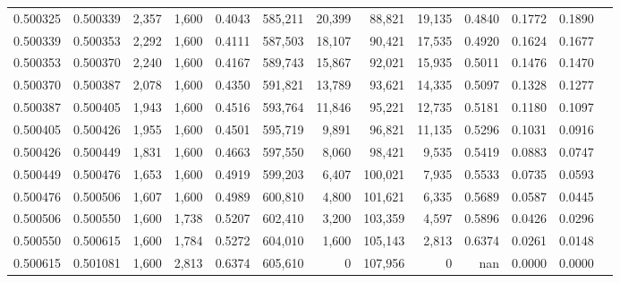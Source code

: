 \begin{tabular}{rrrrrrrrrrrrr}
0.500325 & 0.500339 &  2,357 & 1,600 &                                     0.4043 & 585,211 &  20,399 &  88,821 &  19,135 & 0.4840 & 0.1772 & 0.1890 \\
0.500339 & 0.500353 &  2,292 & 1,600 &                                     0.4111 & 587,503 &  18,107 &  90,421 &  17,535 & 0.4920 & 0.1624 & 0.1677 \\
0.500353 & 0.500370 &  2,240 & 1,600 &                                     0.4167 & 589,743 &  15,867 &  92,021 &  15,935 & 0.5011 & 0.1476 & 0.1470 \\
0.500370 & 0.500387 &  2,078 & 1,600 &                                     0.4350 & 591,821 &  13,789 &  93,621 &  14,335 & 0.5097 & 0.1328 & 0.1277 \\
0.500387 & 0.500405 &  1,943 & 1,600 &                                     0.4516 & 593,764 &  11,846 &  95,221 &  12,735 & 0.5181 & 0.1180 & 0.1097 \\
0.500405 & 0.500426 &  1,955 & 1,600 &                                     0.4501 & 595,719 &   9,891 &  96,821 &  11,135 & 0.5296 & 0.1031 & 0.0916 \\
0.500426 & 0.500449 &  1,831 & 1,600 &                                     0.4663 & 597,550 &   8,060 &  98,421 &   9,535 & 0.5419 & 0.0883 & 0.0747 \\
0.500449 & 0.500476 &  1,653 & 1,600 &                                     0.4919 & 599,203 &   6,407 & 100,021 &   7,935 & 0.5533 & 0.0735 & 0.0593 \\
0.500476 & 0.500506 &  1,607 & 1,600 &                                     0.4989 & 600,810 &   4,800 & 101,621 &   6,335 & 0.5689 & 0.0587 & 0.0445 \\
0.500506 & 0.500550 &  1,600 & 1,738 &                                     0.5207 & 602,410 &   3,200 & 103,359 &   4,597 & 0.5896 & 0.0426 & 0.0296 \\
0.500550 & 0.500615 &  1,600 & 1,784 &                                     0.5272 & 604,010 &   1,600 & 105,143 &   2,813 & 0.6374 & 0.0261 & 0.0148 \\
0.500615 & 0.501081 &  1,600 & 2,813 &                                     0.6374 & 605,610 &       0 & 107,956 &       0 &    nan & 0.0000 & 0.0000 \\
\bottomrule
\end{tabular}
